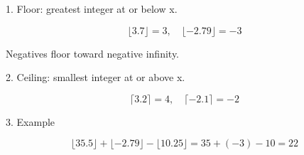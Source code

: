 1. Floor: greatest integer at or below x.

$$ \lfloor 3.7 \rfloor = 3, \quad \lfloor -2.79 \rfloor = -3 $$

Negatives floor toward negative infinity.

2. Ceiling: smallest integer at or above x.

$$ \lceil 3.2 \rceil = 4, \quad \lceil -2.1 \rceil = -2 $$

3. Example

$$ \lfloor 35.5 \rfloor + \lfloor -2.79 \rfloor - \lfloor 10.25 \rfloor = 35+(-3)-10 = 22 $$
